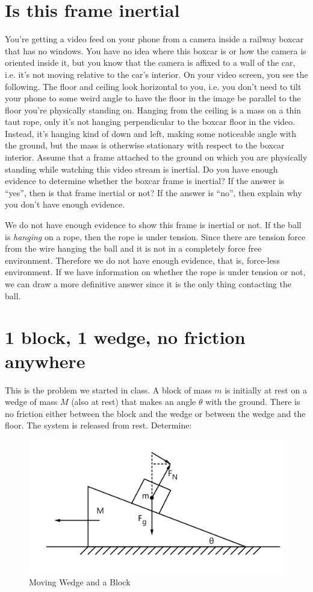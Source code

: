 \documentclass[12pt]{article}
\begin{document}
\section{Is this frame inertial}
You’re getting a video feed on your phone from a camera inside a railway boxcar that has no windows. You have no idea where this boxcar is or how the camera is oriented inside it, but you know that the camera is affixed to a wall of the car, i.e. it’s not moving relative to the car’s interior. On your video screen, you see the following. The floor and ceiling look horizontal to you, i.e. you don’t need to tilt your phone to some weird angle to have the floor in the image be parallel to the floor you’re physically standing on. Hanging from the ceiling is a mass on a thin taut rope, only it’s not hanging perpendicular to the boxcar floor in the video. Instead, it’s hanging kind of down and left, making some noticeable angle with the ground, but the mass is otherwise stationary with respect to the boxcar interior. Assume that a frame attached to the ground on which you are physically standing while watching this video stream is inertial. Do you have enough evidence to determine whether the boxcar frame is inertial? If the answer is “yes”, then is that frame inertial or not? If the answer is “no”, then explain why you don’t have enough evidence.

We do not have enough evidence to show this frame is inertial or not. If the ball is \textit{hanging} on a rope, then the rope is under tension. Since there are tension force from the wire hanging the ball and it is not in a completely force free environment. Therefore we do not have enough evidence, that is, force-less environment. If we have information on whether the rope is under tension or not, we can draw a more definitive answer since it is the only thing contacting the ball. 


\section{1 block, 1 wedge, no friction anywhere}

This is the problem we started in class. A block of mass $m$ is initially at rest on a wedge of mass $M$ (also at rest) that makes an angle $\theta$ with the ground. There is no friction either between the block and the wedge or between the wedge and the floor. The system is released from rest. Determine:
\begin{figure}[!h]
    \centering
    \includegraphics[width=0.5\linewidth]{Pictures/PS00/wedgeBlock.png}
    \caption{Moving Wedge and a Block}
    \label{fig:01-7}
\end{figure}
\end{document}
